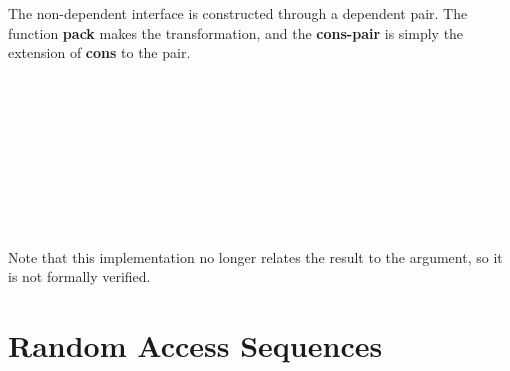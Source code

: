\documentclass[12pt,twoside,notitlepage]{report}
\begin{document}
The non-dependent interface is constructed through a dependent pair. The function \textbf{pack} makes the transformation, and the \textbf{cons-pair} is simply the extension of \textbf{cons} to the pair.
\begin{code}
\\
\> \AgdaSymbol{:}  \AgdaSymbol{\{}\AgdaSymbol{\}} \AgdaSymbol{\{} \AgdaSymbol{:}  \AgdaSymbol{\}} \AgdaSymbol{\{} \AgdaSymbol{:}  \AgdaSymbol{\}}\<%
\\
\>[2]\<[10]%
\>[10]  \AgdaSymbol{:}   \<%
\\
\>[2]\<[10]%
\>[10]  \AgdaSymbol{:}    \<%
\\
\>[2]\<[10]%
\>[10] \AgdaSymbol{(}        \AgdaSymbol{\{}\AgdaSymbol{\}))}\<%
\\
\>[2]\<[10]%
\>[10] \AgdaSymbol{(}        \AgdaSymbol{\{}\AgdaSymbol{\}))}\<%
\\
\> \AgdaSymbol{\{}\AgdaSymbol{\}} \AgdaSymbol{\{}\AgdaSymbol{\}} \AgdaSymbol{\{}\AgdaSymbol{\}}  \AgdaSymbol{=}\<%
\\
\>[0]\<[2]%
\>[2]  \AgdaSymbol{(} \AgdaSymbol{\{} \AgdaSymbol{=} \AgdaSymbol{\}} \AgdaSymbol{\{} \AgdaSymbol{=} \AgdaSymbol{\}} \AgdaSymbol{)} \<%
\\
%
\end{code} 

Note that this implementation no longer relates the result to the argument, so it is not formally verified. 

\section{Random Access Sequences}
\end{document}
